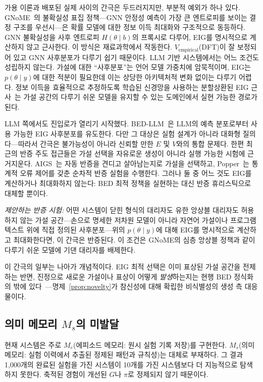 \documentclass[11pt]{article}
\begin{document}
가용 이론과 배포된 실제 사이의 간극은 두드러지지만, 부분적 예외가 하나 있다. GNoME~\citep{merchant2023gnome}의 불확실성 표집 정책---GNN 안정성 예측이 가장 큰 엔트로피를 보이는 결정 구조를 우선시---은 확률 모델에 대한 정보 이득 최대화와 구조적으로 동등하다. GNN 불확실성을 사후 엔트로피 $H(\theta \mid b)$의 프록시로 다루어, EIG를 명시적으로 계산하지 않고 근사한다. 이 방식은 재료과학에서 작동한다. $V_\text{empirical}$(DFT)이 잘 보정되어 있고 GNN 사후분포가 다루기 쉽기 때문이다. LLM 기반 시스템에서는 어느 조건도 성립하지 않는다. 가설에 대한 ``사후분포''는 언어 모델 가중치에 암묵적이며, EIG는 $p(\theta \mid y)$에 대한 적분이 필요한데 이는 상당한 아키텍처적 변화 없이는 다루기 어렵다. 정보 이득을 효율적으로 추정하도록 학습된 신경망을 사용하는 분할상환된 EIG 근사~\citep{foster2021dad}는 가설 공간의 다루기 쉬운 모델을 유지할 수 있는 도메인에서 실현 가능한 경로가 된다.

LLM 쪽에서도 진입로가 열리기 시작했다. BED-LLM~\citep{choudhury2026bedllm}은 LLM의 예측 분포로부터 사용 가능한 EIG 사후분포를 유도한다. 다만 그 대상은 실험 설계가 아니라 대화형 질의다---따라서 간극은 불가능성이 아니라 신뢰할 만한 $E$ 및 $V$와의 통합 문제다. 한편 최근의 반증 주도 접근들은 가설 선택을 자유로운 생성이 아니라 실행 가능한 시험에 근거지운다. AIGS~\citep{liu2024aigs}는 자동 반증을 견디고 살아남는지로 가설을 선택하고, Popper~\citep{huang2025popper}는 통계적 오류 제어를 갖춘 순차적 반증 실험을 수행한다. 그러나 둘 중 어느 것도 EIG를 계산하거나 최대화하지 않는다: BED 최적 정책을 실현하는 대신 반증 휴리스틱으로 대체할 뿐이다.

\textit{제안하는 반증 시험:} 어떤 시스템이 닫힌 형식의 대리자도 유한 앙상블 대리자도 허용하지 않는 가설 공간---손으로 명세한 저차원 모델이 아니라 자연어 가설이나 프로그램 텍스트 위에 직접 정의된 사후분포---위의 $p(\theta \mid y)$에 대해 EIG를 명시적으로 계산하고 최대화한다면, 이 간극은 반증된다. 이 조건은 GNoME의 심층 앙상블 정책과 같이 다루기 쉬운 모델에 기댄 대리자를 배제한다.

이 간극의 일부는 나아가 개념적이다. EIG 최적 선택은 이미 표상된 가설 공간을 전제하는 반면, 진정으로 새로운 가설이나 표상이 어떻게 \emph{발생}하는지는 현행 BED 정식화의 밖에 있다~\citep{yanai2019night}---명제~\ref{prop:novelty}가 참신성에 대해 확립한 비식별성의 생성 측 대응물이다.

\subsection{의미 메모리 $M_s$의 미발달}

현재 시스템은 주로 $M_e$(에피소드 메모리: 원시 실험 기록 저장)를 구현한다. $M_s$(의미 메모리: 실험 이력에서 추출된 정제된 패턴과 규칙성)는 대체로 부재하다. 그 결과 1,000개의 완료된 실험을 가진 시스템이 10개를 가진 시스템보다 더 지능적으로 탐색하지 못한다. 축적된 경험이 개선된 $G$나 $\pi$로 정제되지 않기 때문이다.
\end{document}
